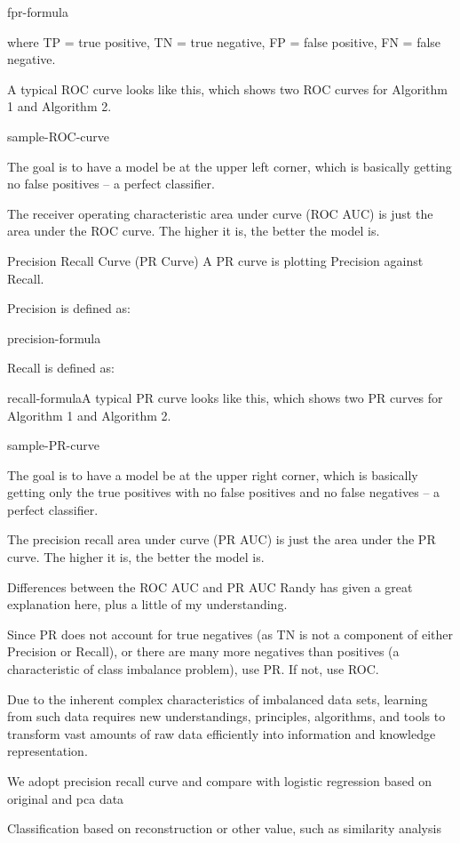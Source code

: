 fpr-formula

where TP = true positive, TN = true negative, FP = false positive, FN = false negative.

A typical ROC curve looks like this, which shows two ROC curves for Algorithm 1 and Algorithm 2.

sample-ROC-curve

The goal is to have a model be at the upper left corner, which is basically getting no false positives – a perfect classifier.

The receiver operating characteristic area under curve (ROC AUC) is just the area under the ROC curve. The higher it is, the better the model is.

Precision Recall Curve (PR Curve)
A PR curve is plotting Precision against Recall.

Precision is defined as:

precision-formula

Recall is defined as:

recall-formulaA typical PR curve looks like this, which shows two PR curves for Algorithm 1 and Algorithm 2.

sample-PR-curve

The goal is to have a model be at the upper right corner, which is basically getting only the true positives with no false positives and no false negatives – a perfect classifier.

The precision recall area under curve (PR AUC) is just the area under the PR curve. The higher it is, the better the model is.

Differences between the ROC AUC and PR AUC
Randy has given a great explanation here, plus a little of my understanding.

Since PR does not account for true negatives (as TN is not a component of either Precision or Recall), or there are many more negatives than positives (a characteristic of class imbalance problem), use PR. If not, use ROC.

Due to the inherent complex characteristics of imbalanced data sets, learning from such data requires new understandings, principles, algorithms, and tools to transform vast amounts of raw data efficiently into information and knowledge representation.

We adopt precision recall curve and compare with logistic regression based on original and pca data

Classification based on reconstruction or other value, such as similarity analysis

